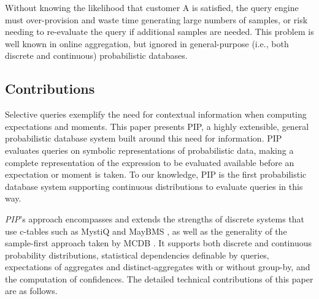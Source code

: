 Without knowing the likelihood that customer A is satisfied, the query engine must over-provision and waste time generating large numbers of samples, or risk needing to re-evaluate the query if additional samples are needed.  This problem is well known in online aggregation, but ignored in general-purpose (i.e., both discrete and continuous) probabilistic databases.  

\subsection{Contributions}

Selective queries exemplify the need for contextual information when computing expectations and moments.  This paper presents PIP, a highly extensible, general probabilistic database system built around this need for information.  PIP evaluates queries on symbolic representations of probabilistic data, making a complete representation of the expression to be evaluated available before an expectation or moment is taken.  To our knowledge, PIP is the first probabilistic database system supporting continuous distributions to evaluate queries in this way.

{\em PIP}\/'s approach encompasses and extends the strengths of discrete systems that use c-tables such as MystiQ \cite{dalvi07efficient} and MayBMS \cite{AJKO2008}, as well as the generality of the sample-first approach taken by MCDB \cite{MCDB}.  It supports both discrete and continuous probability distributions, statistical dependencies definable by queries, expectations of aggregates and distinct-aggregates with or without group-by,  and the computation of confidences. The detailed technical contributions of this paper are as follows.

